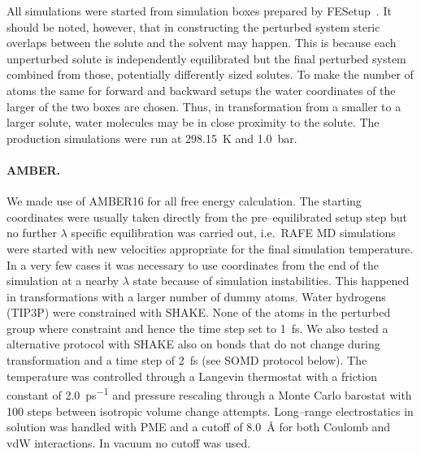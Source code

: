 \documentclass[journal=jctcce,manuscript=article]{achemso}
\begin{document}
All simulations were started from simulation boxes prepared by 
FESetup~\cite{loeffler_fesetup:_2015}.  It should be noted, however, that in 
constructing the perturbed system steric overlaps between the solute and the 
solvent may happen.  This is because each unperturbed solute is independently 
equilibrated but the final perturbed system combined from those, potentially 
differently sized solutes.  To make the number of atoms the same for forward 
and backward setups the water coordinates of the larger of the two boxes are 
chosen.  Thus, in transformation from a smaller to a larger solute, water 
molecules may be in close proximity to the solute.  The production simulations 
were run at \SI{298.15}{K} and \SI{1.0}{bar}.

\paragraph{AMBER.} We made use of AMBER16 for all free energy calculation. The 
starting coordinates were usually taken directly from the pre--equilibrated 
setup step but no further $\lambda$ specific equilibration  was carried out, 
i.e.\ RAFE MD simulations were started with new velocities appropriate for the 
final simulation temperature.  In a very few cases it was necessary to use 
coordinates from the end of the simulation at a nearby $\lambda$ state because 
of simulation instabilities. This happened in transformations with a larger 
number of dummy atoms.  Water hydrogens (TIP3P) were constrained with SHAKE. 
None of the atoms in the perturbed group where constraint and hence the time 
step set to \SI{1}{fs}.  We also tested a alternative protocol with 
SHAKE also on bonds that do not change during transformation and a time step of 
\SI{2}{fs} (see SOMD protocol below). The temperature was controlled through a 
Langevin thermostat with a friction constant of \SI{2.0}{ps^{-1}} and pressure 
rescaling through a Monte Carlo barostat with 100 steps between isotropic 
volume change attempts.  Long--range electrostatics in solution was handled 
with PME and a cutoff of \SI{8.0}{\angstrom} for both Coulomb and vdW 
interactions.  In vacuum no cutoff was used.
\end{document}
